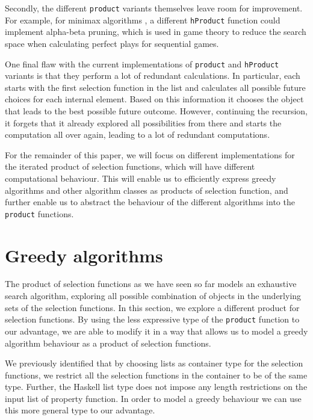 \documentclass[runningheads]{llncs}
\begin{document}
Secondly, the different \texttt{product} variants themselves leave room for improvement. For example, for minimax algorithms \cite{escardo2010sequential}, a different \texttt{hProduct} function could implement alpha-beta pruning, which is used in game theory to reduce the search space when calculating perfect plays for sequential games.

One final flaw with the current implementations of \texttt{product} and \texttt{hProduct} variants is that they perform a lot of redundant calculations. In particular, each starts with the first selection function in the list and calculates all possible future choices for each internal element. Based on this information it chooses the object that leads to the best possible future outcome. However, continuing the recursion, it forgets that it already explored all possibilities from there and starts the computation all over again, leading to a lot of redundant computations.

For the remainder of this paper, we will focus on different implementations for the iterated product of selection functions, which will have different computational behaviour. This will enable us to efficiently express greedy algorithms and other algorithm classes as products of selection function, and further enable us to abstract the behaviour of the different algorithms into the \texttt{product} functions.
%
% 
%
\section{Greedy algorithms}
\label{Greedy Algorithms}
The product of selection functions as we have seen so far models an exhaustive search algorithm, exploring all possible combination of objects in the underlying sets of the selection functions. In this section, we explore a different product for selection functions. By using the less expressive type of the \texttt{product} function to our advantage, we are able to modify it in a way that allows us to model a greedy algorithm behaviour as a product of selection functions.

We previously identified that by choosing lists as container type for the selection functions, we restrict all the selection functions in the container to be of the same type. Further, the Haskell list type does not impose any length restrictions on the input list of property function. In order to model a greedy behaviour we can use this more general type to our advantage.
\end{document}
